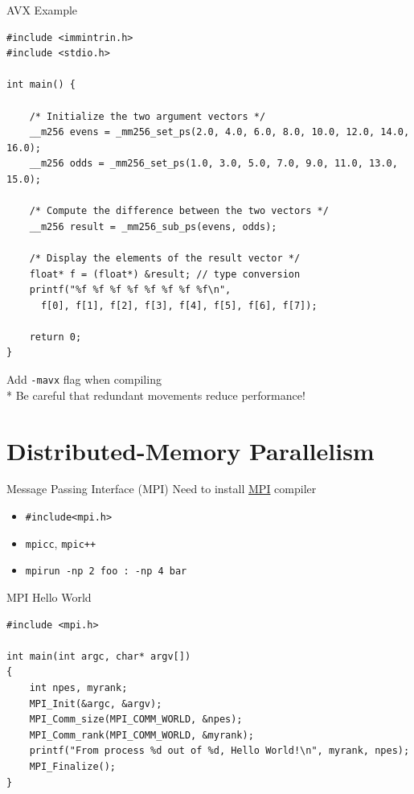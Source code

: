 \documentclass{../TexTemplate/myslide}
\begin{document}
\begin{frame}[fragile]{AVX Example}
\begin{lstlisting}[basicstyle=\scriptsize]
#include <immintrin.h>
#include <stdio.h>

int main() {

    /* Initialize the two argument vectors */
    __m256 evens = _mm256_set_ps(2.0, 4.0, 6.0, 8.0, 10.0, 12.0, 14.0, 16.0);
    __m256 odds = _mm256_set_ps(1.0, 3.0, 5.0, 7.0, 9.0, 11.0, 13.0, 15.0);

    /* Compute the difference between the two vectors */
    __m256 result = _mm256_sub_ps(evens, odds);

    /* Display the elements of the result vector */
    float* f = (float*) &result; // type conversion
    printf("%f %f %f %f %f %f %f %f\n",
      f[0], f[1], f[2], f[3], f[4], f[5], f[6], f[7]);

    return 0;
}
\end{lstlisting}
Add \verb'-mavx' flag when compiling\\
* Be careful that redundant movements reduce performance!
\end{frame}

\section{Distributed-Memory Parallelism}
\begin{frame}
\sectionpage
\end{frame}

\begin{frame}[fragile]{Message Passing Interface (MPI)}
Need to install \href{http://www.mpich.org/}{MPI} compiler
\begin{itemize}
	\item \verb'#include<mpi.h>'
	\item \verb'mpicc', \verb'mpic++'
	\item \verb'mpirun -np 2 foo : -np 4 bar'
\end{itemize}
\end{frame}

\begin{frame}[fragile]{MPI Hello World}
\begin{lstlisting}
#include <mpi.h>

int main(int argc, char* argv[])
{
    int npes, myrank;
    MPI_Init(&argc, &argv);
    MPI_Comm_size(MPI_COMM_WORLD, &npes);
    MPI_Comm_rank(MPI_COMM_WORLD, &myrank);
    printf("From process %d out of %d, Hello World!\n", myrank, npes);
    MPI_Finalize();
}
\end{lstlisting}
\end{frame}
\end{document}
